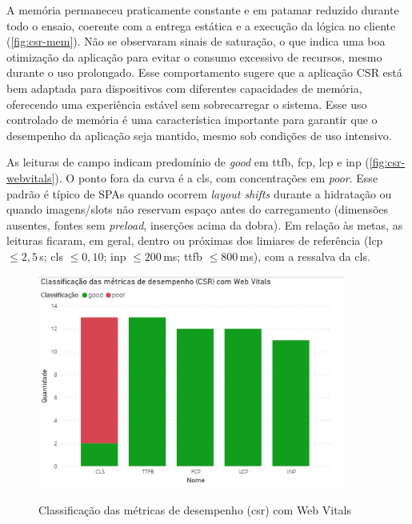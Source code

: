 {A memória permaneceu praticamente constante e em patamar reduzido durante todo o ensaio, coerente com a entrega estática e a execução da lógica no cliente (\autoref{fig:csr-mem}). Não se observaram sinais de saturação, o que indica uma boa otimização da aplicação para evitar o consumo excessivo de recursos, mesmo durante o uso prolongado. Esse comportamento sugere que a aplicação CSR está bem adaptada para dispositivos com diferentes capacidades de memória, oferecendo uma experiência estável sem sobrecarregar o sistema. Esse uso controlado de memória é uma característica importante para garantir que o desempenho da aplicação seja mantido, mesmo sob condições de uso intensivo.

\clearpage
As leituras de campo indicam predomínio de \textit{good} em \acrshort{ttfb}, \acrshort{fcp}, \acrshort{lcp} e \acrshort{inp} (\autoref{fig:csr-webvitals}). O ponto fora da curva é a \acrshort{cls}, com concentrações em \textit{poor}. Esse padrão é típico de SPAs quando ocorrem \emph{layout shifts} durante a hidratação ou quando imagens/slots não reservam espaço antes do carregamento (dimensões ausentes, fontes sem \emph{preload}, inserções acima da dobra). Em relação às metas, as leituras ficaram, em geral, dentro ou próximas dos limiares de referência (\acrshort{lcp} $\leq 2{,}5$\,s; \acrshort{cls} $\leq 0{,}10$; \acrshort{inp} $\leq 200$\,ms; \acrshort{ttfb} $\leq 800$\,ms), com a ressalva da \acrshort{cls}.

\begin{figure}[h]
\centering
\caption{Classificação das métricas de desempenho (\acrshort{csr}) com Web Vitals}
\includegraphics[width=0.9\textwidth]{media/metricas_csr_web_vitals.jpeg}
\label{fig:csr-webvitals}
\end{figure}

}
